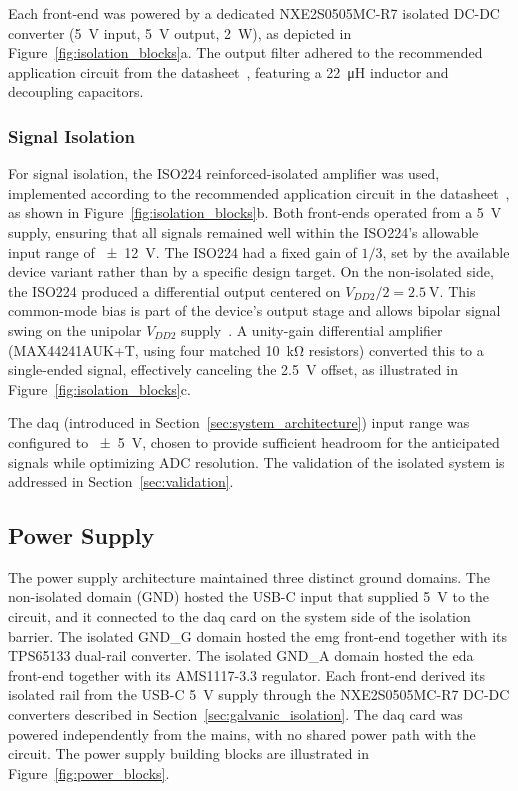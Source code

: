Each front-end was powered by a dedicated NXE2S0505MC-R7 isolated DC-DC converter (\SI{5}{\volt} input, \SI{5}{\volt} output, \SI{2}{\watt}), as depicted in Figure~\ref{fig:isolation_blocks}a. The output filter adhered to the recommended application circuit from the datasheet~\cite{noauthor_nxe2s0505mcisolated_nodate}, featuring a \SI{22}{\micro\henry} inductor and decoupling capacitors.

\subsubsection{Signal Isolation}

For signal isolation, the ISO224 reinforced-isolated amplifier was used, implemented according to the recommended application circuit in the datasheet~\cite{noauthor_iso224_nodate}, as shown in Figure~\ref{fig:isolation_blocks}b. Both front-ends operated from a \SI{5}{\volt} supply, ensuring that all signals remained well within the ISO224's allowable input range of \SI{\pm 12}{\volt}. The ISO224 had a fixed gain of $1/3$, set by the available device variant rather than by a specific design target. On the non-isolated side, the ISO224 produced a differential output centered on \( V_{DD2}/2 = \SI{2.5}{\volt} \). This common-mode bias is part of the device's output stage and allows bipolar signal swing on the unipolar \( V_{DD2} \) supply~\cite{noauthor_iso224_nodate}. A unity-gain differential amplifier (MAX44241AUK+T, using four matched \SI{10}{\kilo\ohm} resistors) converted this to a single-ended signal, effectively canceling the \SI{2.5}{\volt} offset, as illustrated in Figure~\ref{fig:isolation_blocks}c.


The \gls{daq} (introduced in Section~\ref{sec:system_architecture}) input range was configured to \SI{\pm 5}{\volt}, chosen to provide sufficient headroom for the anticipated signals while optimizing ADC resolution. The validation of the isolated system is addressed in Section~\ref{sec:validation}.


\subsection{Power Supply}
\label{sec:PSU}
The power supply architecture maintained three distinct ground domains. The non-isolated domain (GND) hosted the USB-C input that supplied \SI{5}{\volt} to the circuit, and it connected to the \gls{daq} card on the system side of the isolation barrier. The isolated GND\_G domain hosted the \gls{emg} front-end together with its TPS65133 dual-rail converter. The isolated GND\_A domain hosted the \gls{eda} front-end together with its AMS1117-3.3 regulator. Each front-end derived its isolated rail from the USB-C \SI{5}{\volt} supply through the NXE2S0505MC-R7 DC-DC converters described in Section~\ref{sec:galvanic_isolation}. The \gls{daq} card was powered independently from the mains, with no shared power path with the circuit. The power supply building blocks are illustrated in Figure~\ref{fig:power_blocks}.

